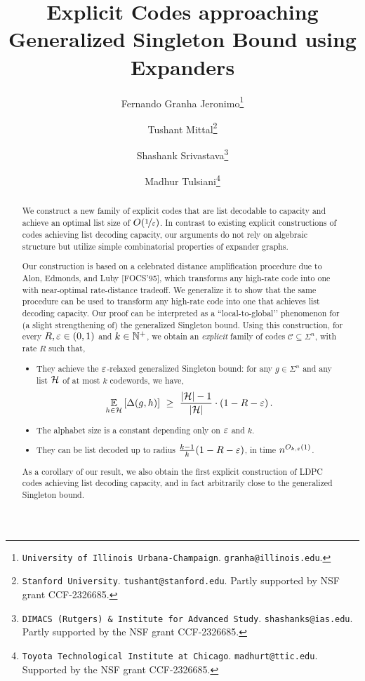 \documentclass{article}
\title{Explicit Codes approaching Generalized Singleton Bound using Expanders}
\author{
Fernando Granha Jeronimo\thanks{{\tt University of Illinois Urbana-Champaign}. {\tt granha@illinois.edu}. }
\and
Tushant Mittal\thanks{{\tt Stanford University}. {\tt tushant@stanford.edu}. Partly supported by NSF grant CCF-2326685.}
\and
Shashank Srivastava\thanks{{\tt DIMACS (Rutgers) \& Institute for Advanced Study}. {\tt shashanks@ias.edu}. Partly supported by the NSF grant CCF-2326685.}
\and
Madhur Tulsiani\thanks{{\tt Toyota Technological Institute at Chicago}. {\tt madhurt@ttic.edu}. Supported by the NSF grant CCF-2326685.} 
}
\begin{document}
\date{}
\maketitle

\thispagestyle{empty}

\begin{abstract}
We construct a new family of explicit codes that are list decodable to capacity and achieve an optimal list size of $O(\nicefrac{1}{\varepsilon})$. In contrast to existing explicit constructions of codes achieving list decoding capacity, our arguments do not rely on algebraic structure but utilize simple combinatorial properties of expander graphs. 
\medskip


%
Our construction is based on a celebrated distance amplification procedure due to Alon, Edmonds, and Luby [FOCS'95], which transforms any high-rate code into one with near-optimal rate-distance tradeoff. We generalize it to show that the same procedure can be used to transform any high-rate code into one that achieves list decoding capacity. Our proof can be interpreted as a ``local-to-global’' phenomenon for (a slight strengthening of) the generalized Singleton bound.
%
Using this construction,  for every $R, \varepsilon \in (0,1)$ and $k \in {\mathbb{N}}^+$, we obtain an \emph{explicit} family of codes $\mathcal{C} \subseteq \Sigma^n$, with rate $R$ such that,\begin{itemize}
	\item They achieve the $\varepsilon$-relaxed generalized Singleton bound: for any $g \in  \Sigma^n$ and any list ${\mathcal H}$ of at most $k$ codewords, we have, 
\[ \Ex{h \in \calH}{\Delta(g,h)} ~\geq~ \frac{\abs{\calH}-1}{\abs{\calH}} \cdot (1 - R - \eps) \mper
\]

	\item The alphabet size is a constant depending only on $\varepsilon$ and $k$.
	\item They can be list decoded up to radius $\frac{k-1}{k}(1-R-\varepsilon)$, in time $n^{O_{k,\varepsilon}(1)}$.
\end{itemize}
\medskip

As a corollary of our result, we also obtain the first explicit construction of LDPC codes achieving list decoding capacity, and in fact arbitrarily close to the generalized Singleton bound.



\end{abstract}
\end{document}
